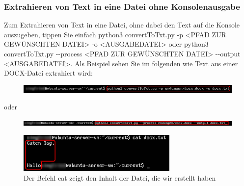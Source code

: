 \documentclass[12pt]{scrartcl}
\begin{document}
\subsubsection{Extrahieren von Text in eine Datei ohne Konsolenausgabe}
\label{sec:first-steps-extraction-file-without}
Zum Extrahieren von Text in eine Datei, ohne dabei den Text auf die Konsole auszugeben, tippen Sie einfach python3 convertToTxt.py -p <PFAD ZUR GEWÜNSCHTEN DATEI> -o <AUSGABEDATEI> oder python3 convertToTxt.py -{}-process <PFAD ZUR GEWÜNSCHTEN DATEI> -{}-output <AUSGABEDATEI>. Als Beispiel sehen Sie im folgenden wie Text aus einer DOCX-Datei extrahiert wird:
\begin{figure}[htbp]
\includegraphics[width=1.0\textwidth]{ersteSchritteExtractIntoFileWithoutConsole001}\par\vspace{0.25cm}
\label{fig:ersteSchritteExtractIntoFileWithoutConsole001}
\end{figure}
\begin{center}
oder
\end{center}
\begin{figure}[htbp]
\includegraphics[width=1.0\textwidth]{ersteSchritteExtractIntoFileWithoutConsole002}\par

\vspace{0.25cm}
\label{fig:ersteSchritteExtractIntoFileWithoutConsole002}
\end{figure}
\begin{figure}[htbp]
\centering
\includegraphics[width=0.7\textwidth]{ersteSchritteExtractIntoFileWithoutConsole003}\par\vspace{0.25cm}
\caption{Der Befehl cat zeigt den Inhalt der Datei, die wir erstellt haben}
\label{fig:ersteSchritteExtractIntoFileWithoutConsole003}
\end{figure}
\newpage
\end{document}
